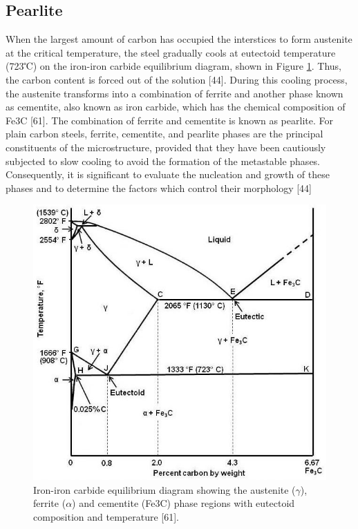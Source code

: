 \documentclass[12pt]{report}
\begin{document}
\subsection{Pearlite} 
When the largest amount of carbon has occupied the interstices to form austenite at the critical temperature, the steel gradually cools at eutectoid temperature (723℃) on the iron-iron carbide equilibrium diagram, shown in Figure \ref{ch3:figure:equilibrium}. Thus, the carbon content is forced out of the solution [44]. During this cooling process, the austenite transforms into a combination of ferrite and another phase known as cementite, also known as iron carbide, which has the chemical composition of Fe3C [61]. The combination of ferrite and cementite is known as pearlite.  
For plain carbon steels, ferrite, cementite, and pearlite phases are the principal constituents of the microstructure, provided that they have been cautiously subjected to slow cooling to avoid the formation of the metastable phases. Consequently, it is significant to evaluate the nucleation and growth of these phases and to determine the factors which control their morphology [44]

\begin{figure}[H]
    \centering
    \includegraphics[width=\textwidth]{iron-iron_carbide_equilibrium_diagram.jpg}
    \caption{Iron-iron carbide equilibrium diagram showing the austenite ($\gamma$), ferrite ($\alpha$) and cementite (Fe3C) phase regions with eutectoid composition and temperature [61].}
    \label{ch3:figure:equilibrium}
\end{figure}
\end{document}
